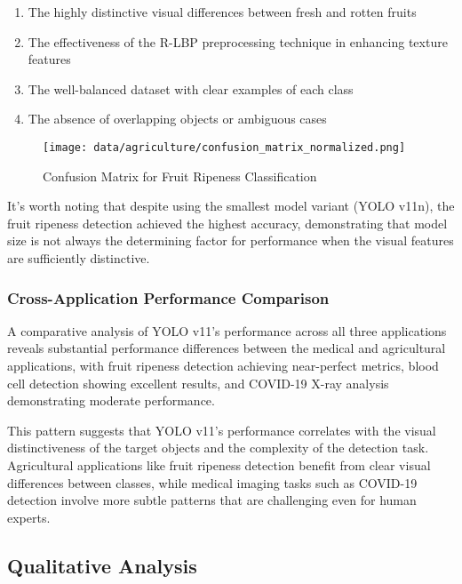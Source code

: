 \begin{multicols}{2}
\begin{enumerate}
    \item The highly distinctive visual differences between fresh and rotten fruits
    \item The effectiveness of the R-LBP preprocessing technique in enhancing texture features
    \item The well-balanced dataset with clear examples of each class
    \item The absence of overlapping objects or ambiguous cases
\end{enumerate}

\begin{figure}[h]
\centering
\texttt{[image: data/agriculture/confusion\_matrix\_normalized.png]}
\caption{Confusion Matrix for Fruit Ripeness Classification}
\label{fig:fruit_confusion}
\end{figure}

It's worth noting that despite using the smallest model variant (YOLO v11n), the fruit ripeness detection achieved the highest accuracy, demonstrating that model size is not always the determining factor for performance when the visual features are sufficiently distinctive.

\subsubsection{Cross-Application Performance Comparison}

A comparative analysis of YOLO v11's performance across all three applications reveals substantial performance differences between the medical and agricultural applications, with fruit ripeness detection achieving near-perfect metrics, blood cell detection showing excellent results, and COVID-19 X-ray analysis demonstrating moderate performance.

This pattern suggests that YOLO v11's performance correlates with the visual distinctiveness of the target objects and the complexity of the detection task. Agricultural applications like fruit ripeness detection benefit from clear visual differences between classes, while medical imaging tasks such as COVID-19 detection involve more subtle patterns that are challenging even for human experts.

\subsection{Qualitative Analysis}


\end{multicols}
